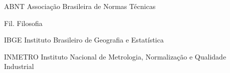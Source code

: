 \documentclass[
  oneside, %
  english,
  brazil
]{abntbibufjf}
\begin{document}



\ilustvaria{} %
\listilustvaria{} %


\cleardoublepage{}




\listoftables* %

\cleardoublepage{}



\begin{siglas}
  \item[ABNT] Associação Brasileira de Normas Técnicas
  \item[Fil.] Filosofia
  \item[IBGE] Instituto Brasileiro de Geografia e Estatística
  \item[INMETRO] Instituto Nacional de Metrologia, Normalização e Qualidade Industrial
\end{siglas}


\end{document}

